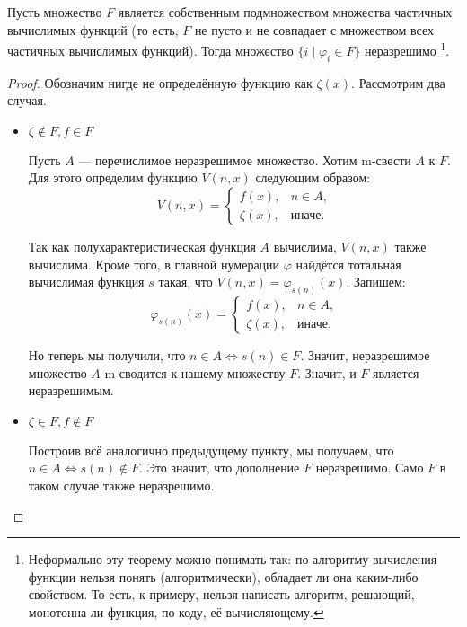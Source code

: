\documentclass{article}
\begin{document}
    \begin{theorem}
        Пусть множество $F$ является собственным подмножеством множества частичных вычислимых
        функций (то есть, $F$ не пусто и не совпадает с множеством всех частичных вычислимых
        функций). Тогда множество $\{i \mid \varphi_i \in F\}$ неразрешимо \footnote{Неформально
        эту теорему можно понимать так: по алгоритму вычисления функции нельзя понять
        (алгоритмически), обладает ли она каким-либо свойством. То есть, к примеру, нельзя
        написать алгоритм, решающий, монотонна ли функция, по коду, её вычисляющему.}.
    \end{theorem}

    \begin{proof}
        Обозначим нигде не определённую функцию как $\zeta(x)$. Рассмотрим два случая.

        \begin{itemize}
            \item $\zeta \not\in F, f \in F$

            Пусть $A$ --- перечислимое неразрешимое множество. Хотим m-свести $A$ к $F$. Для этого
            определим функцию $V(n, x)$ следующим образом:
            $$
                V(n, x) =
                \begin{cases}
                    f(x), & \text{$n \in A$,}\\
                    \zeta(x), & \text{иначе.}
                \end{cases}
            $$

            Так как полухарактеристическая функция $A$ вычислима, $V(n, x)$ также вычислима. Кроме
            того, в главной нумерации $\varphi$ найдётся тотальная вычислимая функция $s$ такая, что
            $V(n, x) = \varphi_{s(n)}(x)$. Запишем:
            $$
                \varphi_{s(n)}(x) =
                \begin{cases}
                    f(x), & \text{$n \in A$,}\\
                    \zeta(x), & \text{иначе.}
                \end{cases}
            $$

            Но теперь мы получили, что $n \in A \iff s(n) \in F$. Значит, неразрешимое множество $A$
            m-сводится к нашему множеству $F$. Значит, и $F$ является неразрешимым.

            \item $\zeta \in F, f \not\in F$

            Построив всё аналогично предыдущему пункту, мы получаем, что $n \in A \iff s(n) \not\in F$.
            Это значит, что дополнение $F$ неразрешимо. Само $F$ в таком случае также неразрешимо.
        \end{itemize}
    \end{proof}
\end{document}
